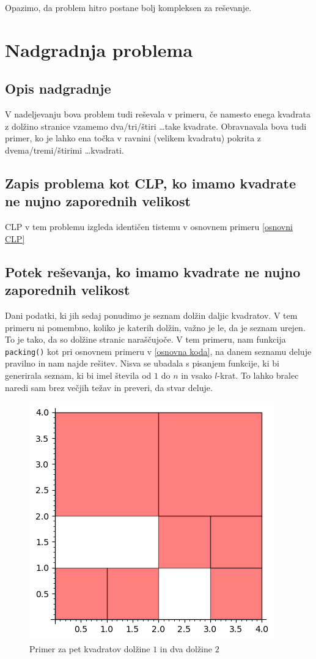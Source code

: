 \documentclass[a4paper, 11pt]{article}
\begin{document}
\noindent Opazimo, da problem hitro postane bolj kompleksen za reševanje.

\section{Nadgradnja problema}
\subsection{Opis nadgradnje}
V nadeljevanju bova problem tudi reševala v primeru, 
če namesto enega kvadrata z dolžino 
stranice vzamemo dva/tri/štiri \dots take kvadrate. 
Obravnavala bova tudi primer, ko je lahko ena točka v ravnini (velikem kvadratu) pokrita z 
dvema/tremi/štirimi \dots  kvadrati.
\subsection{Zapis problema kot CLP, ko imamo kvadrate ne nujno zaporednih velikost}
CLP v tem problemu izgleda identičen tistemu v osnovnem primeru \ref{osnovni CLP}

\subsection{Potek reševanja, ko imamo kvadrate ne nujno zaporednih velikost}
Dani podatki, ki jih sedaj ponudimo je seznam dolžin daljic kvadratov. V tem primeru ni 
pomembno, koliko je katerih dolžin, važno je le, da je seznam urejen. To je tako,
da so dolžine stranic naraščujoče.
V tem primeru, nam funkcija \verb|packing()| kot pri osnovnem primeru v \ref{osnovna koda}, na danem seznamu deluje pravilno in nam najde rešitev.
Nisva se ubadala s pisanjem funkcije, ki bi generirala seznam, ki bi imel števila od 
$1$ do $n$ in vsako $l$-krat. To lahko bralec naredi sam brez večjih težav in preveri, da 
stvar deluje.

\begin{figure}[H]
    \centering
    \includegraphics{Vec_istih_kvadratov.png}
    \caption{Primer za pet kvadratov dolžine $1$ in dva dolžine $2$}
\end{figure}
\end{document}
